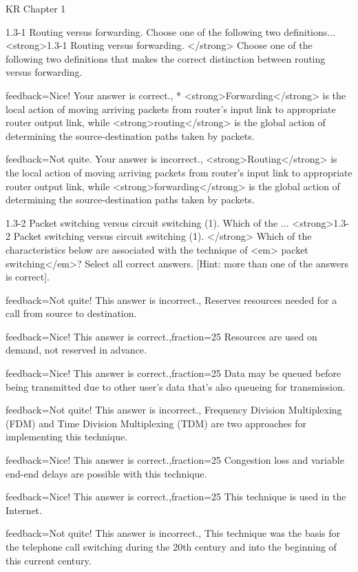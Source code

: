 \documentclass[a4paper]{article}
\begin{document}
\begin{quiz}{KR Chapter 1}
\begin{multi}[
	points=1,
	penalty=0.33333,
]{1.3-1 Routing versus forwarding.  Choose one of the following two definitions...}
<strong>1.3-1 Routing versus forwarding. </strong> Choose one of the following two definitions that makes the correct distinction between routing versus forwarding.
\item[feedback={Nice! Your answer is correct.},]* <strong>Forwarding</strong> is the local action of moving arriving packets from router’s input link to appropriate router output link, while <strong>routing</strong> is the global action of determining the source-destination paths taken by packets.
\item[feedback={Not quite. Your answer is incorrect.},] <strong>Routing</strong> is the local action of moving arriving packets from router’s input link to appropriate router output link, while <strong>forwarding</strong> is the global action of determining the source-destination paths taken by packets.
\end{multi}

\begin{multi}[
	points=1,
	penalty=0.33333,
	multiple,
]{1.3-2 Packet switching versus circuit switching (1).  Which of the ...}
<strong>1.3-2 Packet switching versus circuit switching (1). </strong> Which of the characteristics below are associated with the technique of <em> packet switching</em>? Select all correct answers. [Hint: more than one of the answers is correct].
\item[feedback={Not quite! This answer is incorrect.},] Reserves resources needed for a call from source to destination.
\item[feedback={Nice! This answer is correct.},fraction=25] Resources are used on demand, not reserved in advance.
\item[feedback={Nice! This answer is correct.},fraction=25] Data may be queued before being transmitted due to other user’s data that’s also queueing for transmission.
\item[feedback={Not quite! This answer is incorrect.},] Frequency Division Multiplexing (FDM) and Time Division Multiplexing (TDM) are two approaches for implementing this technique.
\item[feedback={Nice! This answer is correct.},fraction=25] Congestion loss and variable end-end delays are possible with this technique.
\item[feedback={Nice! This answer is correct.},fraction=25] This technique is used in the Internet.
\item[feedback={Not quite! This answer is incorrect.},] This technique was the basis for the telephone call switching during the 20th century and into the beginning of this current century.
\end{multi}


\end{quiz}
\end{document}
